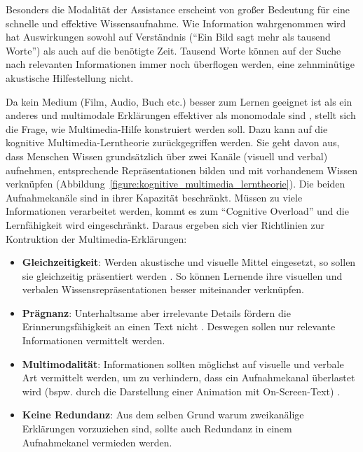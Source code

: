\documentclass[
	headsepline,
	footsepline,
	fontsize=12pt,
	bibliography=totoc
]{scrbook}
\begin{document}
Besonders die Modalität der Assistance erscheint von großer Bedeutung für eine schnelle und effektive Wissensaufnahme. Wie Information wahrgenommen wird hat Auswirkungen sowohl auf Verständnis (\enquote{Ein Bild sagt mehr als tausend Worte}) als auch auf die benötigte Zeit. Tausend Worte können auf der Suche nach relevanten Informationen immer noch überflogen werden, eine zehnminütige akustische Hilfestellung nicht.


Da kein Medium (Film, Audio, Buch etc.) besser zum Lernen geeignet ist als ein anderes \cite{Clark1994, Kozma1994} und multimodale Erklärungen effektiver als monomodale sind \cite{Mayer2002}, stellt sich die Frage, wie Multimedia-Hilfe konstruiert werden soll. Dazu kann auf die kognitive Multimedia-Lerntheorie zurückgegriffen werden. Sie geht davon aus, dass Menschen Wissen grundsätzlich über zwei Kanäle (visuell und verbal) aufnehmen, entsprechende Repräsentationen bilden und mit vorhandenem Wissen verknüpfen (Abbildung~\ref{figure:kognitive_multimedia_lerntheorie}). Die beiden Aufnahmekanäle sind in ihrer Kapazität beschränkt. Müssen zu viele Informationen verarbeitet werden, kommt es zum \enquote{Cognitive Overload} und die Lernfähigkeit wird eingeschränkt. Daraus ergeben sich vier Richtlinien zur Kontruktion der Multimedia-Erklärungen:

\begin{itemize}
	\item \textbf{Gleichzeitigkeit}: Werden akustische und visuelle Mittel eingesetzt, so sollen sie gleichzeitig präsentiert werden \cite{Mayer1991}. So können Lernende ihre visuellen und verbalen Wissensrepräsentationen besser miteinander verknüpfen.
	\item \textbf{Prägnanz}: Unterhaltsame aber irrelevante Details fördern die Erinnerungsfähigkeit an einen Text nicht \cite{Garner1989}. Deswegen sollen nur relevante Informationen vermittelt werden.
	\item \textbf{Multimodalität}: Informationen sollten möglichst auf visuelle und verbale Art vermittelt werden, um zu verhindern, dass ein Aufnahmekanal überlastet wird (bspw. durch die Darstellung einer Animation mit On-Screen-Text) \cite{Moreno1999}.
	\item \textbf{Keine Redundanz}: Aus dem selben Grund warum zweikanälige Erklärungen vorzuziehen sind, sollte auch Redundanz in einem Aufnahmekanel vermieden werden.
\end{itemize}
\end{document}
